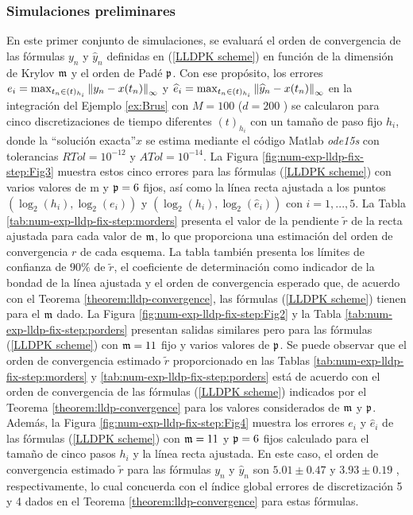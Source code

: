\subsubsection{Simulaciones preliminares}
En este primer conjunto de simulaciones, se evaluará el orden de convergencia de las fórmulas $y_n$ y $\widehat{y}_n$ definidas en (\ref{LLDPK scheme}) en función de la dimensión de Krylov $\mathfrak{m}$ y el orden de Padé $\mathfrak{p}$. Con ese propósito, los errores $e_i=\max_{t_n\in(t)_{h_i}}\left\lVert y_n-x(t_n) \right\rVert_\infty$ y $\widehat{e}_i=\max_{t_n\in(t )_{h_i}}\left\lVert \widehat{y}_n-x(t_n) \right\rVert_\infty$ en la integración del Ejemplo \ref{ex:Brus} con $M=100$ ($d=200$ ) se calcularon para cinco discretizaciones de tiempo diferentes $(t)_{h_i}$ con un tamaño de paso fijo $h_i$, donde la \textquotedblleft solución exacta\textquotedblright $x$ se estima mediante el código Matlab \textit{ode15s} con tolerancias $RTol=10^{ -12}$ y $ATol=10^{-14}$. La Figura \ref{fig:num-exp-lldp-fix-step:Fig3} muestra estos cinco errores para las fórmulas (\ref{LLDPK scheme}) con varios valores de m y $\mathfrak{p}=6$ fijos, así como la línea recta ajustada a los puntos $(\log_2( h_i),\log_2(e_i))$ y $(\log_2(h_i),\log_2(\widehat{e}_i))$ con $i=1,...,5$. La Tabla \ref{tab:num-exp-lldp-fix-step:morders} presenta el valor de la pendiente $\widetilde{r}$ de la recta ajustada para cada valor de $\mathfrak{m}$, lo que proporciona una estimación del orden de convergencia $r$ de cada esquema. La tabla también presenta los límites de confianza de $90\%$ de $\widetilde{r}$, el coeficiente de determinación como indicador de la bondad de la línea ajustada y el orden de convergencia esperado que, de acuerdo con el Teorema \ref{theorem:lldp-convergence}, las fórmulas (\ref{LLDPK scheme}) tienen para el $\mathfrak{m}$ dado. La Figura \ref{fig:num-exp-lldp-fix-step:Fig2} y la Tabla \ref{tab:num-exp-lldp-fix-step:porders} presentan salidas similares pero para las fórmulas (\ref{LLDPK scheme}) con $\mathfrak{m}=11$ fijo y varios valores de $\mathfrak{p}$. Se puede observar que el orden de convergencia estimado $\widetilde{r}$ proporcionado en las Tablas \ref{tab:num-exp-lldp-fix-step:morders} y \ref{tab:num-exp-lldp-fix-step:porders} está de acuerdo con el orden de convergencia de las fórmulas (\ref{LLDPK scheme}) indicados por el Teorema \ref{theorem:lldp-convergence} para los valores considerados de $\mathfrak{m}$ y $\mathfrak{p}$. Además, la Figura \ref{fig:num-exp-lldp-fix-step:Fig4} muestra los errores $e_i$ y $\widehat{e}_i$ de las fórmulas (\ref{LLDPK scheme}) con $\mathfrak{m}=11$ y $\mathfrak{p}=6$ fijos calculado para el tamaño de cinco pasos $h_i$ y la línea recta ajustada. En este caso, el orden de convergencia estimado $\widetilde{r}$ para las fórmulas $y_n$ y $\widehat{y}_n$ son $5.01 \pm 0.47$ y $3.93 \pm 0.19$ , respectivamente, lo cual concuerda con el índice global errores de discretización 5 y 4 dados en el Teorema \ref{theorem:lldp-convergence} para estas fórmulas.


